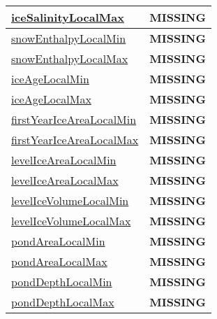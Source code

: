 {\begin{center}
\begin{longtable}{| p{2.0in} | p{4.0in} |}
    \hline
    \hyperref[subsec:var_sec_tracer_monotonicity_iceSalinityLocalMax]{iceSalinityLocalMax} & {\bf \color{red} MISSING} \\
    \hline
    \hyperref[subsec:var_sec_tracer_monotonicity_snowEnthalpyLocalMin]{snowEnthalpyLocalMin} & {\bf \color{red} MISSING} \\
    \hline
    \hyperref[subsec:var_sec_tracer_monotonicity_snowEnthalpyLocalMax]{snowEnthalpyLocalMax} & {\bf \color{red} MISSING} \\
    \hline
    \hyperref[subsec:var_sec_tracer_monotonicity_iceAgeLocalMin]{iceAgeLocalMin} & {\bf \color{red} MISSING} \\
    \hline
    \hyperref[subsec:var_sec_tracer_monotonicity_iceAgeLocalMax]{iceAgeLocalMax} & {\bf \color{red} MISSING} \\
    \hline
    \hyperref[subsec:var_sec_tracer_monotonicity_firstYearIceAreaLocalMin]{firstYearIceAreaLocalMin} & {\bf \color{red} MISSING} \\
    \hline
    \hyperref[subsec:var_sec_tracer_monotonicity_firstYearIceAreaLocalMax]{firstYearIceAreaLocalMax} & {\bf \color{red} MISSING} \\
    \hline
    \hyperref[subsec:var_sec_tracer_monotonicity_levelIceAreaLocalMin]{levelIceAreaLocalMin} & {\bf \color{red} MISSING} \\
    \hline
    \hyperref[subsec:var_sec_tracer_monotonicity_levelIceAreaLocalMax]{levelIceAreaLocalMax} & {\bf \color{red} MISSING} \\
    \hline
    \hyperref[subsec:var_sec_tracer_monotonicity_levelIceVolumeLocalMin]{levelIceVolumeLocalMin} & {\bf \color{red} MISSING} \\
    \hline
    \hyperref[subsec:var_sec_tracer_monotonicity_levelIceVolumeLocalMax]{levelIceVolumeLocalMax} & {\bf \color{red} MISSING} \\
    \hline
    \hyperref[subsec:var_sec_tracer_monotonicity_pondAreaLocalMin]{pondAreaLocalMin} & {\bf \color{red} MISSING} \\
    \hline
    \hyperref[subsec:var_sec_tracer_monotonicity_pondAreaLocalMax]{pondAreaLocalMax} & {\bf \color{red} MISSING} \\
    \hline
    \hyperref[subsec:var_sec_tracer_monotonicity_pondDepthLocalMin]{pondDepthLocalMin} & {\bf \color{red} MISSING} \\
    \hline
    \hyperref[subsec:var_sec_tracer_monotonicity_pondDepthLocalMax]{pondDepthLocalMax} & {\bf \color{red} MISSING} \\
    \hline

\end{longtable}
\end{center}}
